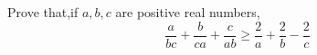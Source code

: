 Prove that,if $a,b,c$ are positive real numbers,
\[  \dfrac{a}{bc}+ \dfrac{b}{ca}+\dfrac{c}{ab}\geq \dfrac{2}{a}+\dfrac{2}{b}-\dfrac{2}{c}\]